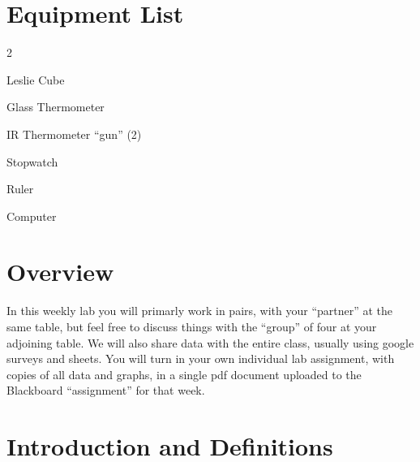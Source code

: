 


\section*{Equipment List}

\begin{multicols}{2}   %
\begin{equipment}
  \item Leslie Cube
  \item Glass Thermometer
  \item IR Thermometer ``gun'' (2)
  \item Stopwatch
  \item Ruler
  \item Computer
\end{equipment}
\end{multicols}

\section*{Overview}

In this weekly lab you will primarly work in pairs, with your ``partner'' at the same table, but feel free to discuss things with the ``group'' of four at your adjoining table.  We will also share data with the entire class, usually using google surveys and sheets.  You will turn in your own individual lab assignment, with copies of all data and graphs, in a single pdf document uploaded to the Blackboard ``assignment'' for that week.

\section{Introduction and Definitions}

